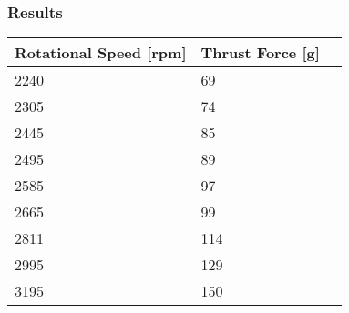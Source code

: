 \subsubsection{Results}
\begin{table}[H]
	\centering
	\begin{tabular}{|l|l|p{4.3cm}|}
		\hline%
		\textbf{Rotational Speed [rpm]}    &  \textbf{Thrust Force [g]}          \\ 
		\hline%
		2240                                         & 69               \\
		\hline%
		2305 										  & 74               \\
		\hline%
		2445                              			  & 85               \\
		\hline%
		2495                              			  & 89               \\
		\hline%
		2585                                         & 97               \\
		\hline%
		2665 										  & 99               \\
		\hline%
		2811                              			  & 114               \\
		\hline%
		2995                                          & 129              \\
		\hline%
		3195 										  & 150               \\
		\hline%

\end{tabular}
\end{table}
